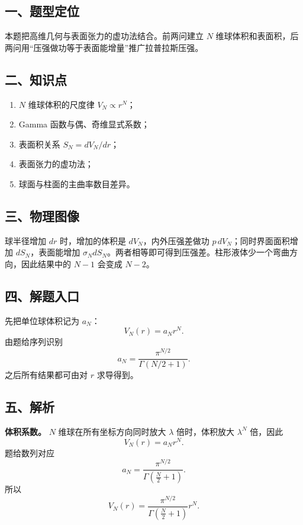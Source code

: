 \documentclass[12pt,a4paper,UTF8]{ctexart}
\newcommand{\tightlist}{\setlength{\itemsep}{0pt}\setlength{\parskip}{0pt}}
\begin{document}
\subsection{一、题型定位}\label{ux4e00ux9898ux578bux5b9aux4f4d-2}

本题把高维几何与表面张力的虚功法结合。前两问建立 \(N\)
维球体积和表面积，后两问用``压强做功等于表面能增量''推广拉普拉斯压强。

\subsection{二、知识点}\label{ux4e8cux77e5ux8bc6ux70b9-2}

\begin{enumerate}
\def\labelenumi{\arabic{enumi}.}
\tightlist
\item
  \(N\) 维球体积的尺度律 \(V_N\propto r^N\)；
\item
  Gamma 函数与偶、奇维显式系数；
\item
  表面积关系 \(S_N=dV_N/dr\)；
\item
  表面张力的虚功法；
\item
  球面与柱面的主曲率数目差异。
\end{enumerate}

\subsection{三、物理图像}\label{ux4e09ux7269ux7406ux56feux50cf-2}

球半径增加 \(dr\) 时，增加的体积是 \(dV_N\)，内外压强差做功
\(p\,dV_N\)；同时界面面积增加 \(dS_N\)，表面能增加
\(\sigma_NdS_N\)。两者相等即可得到压强差。柱形液体少一个弯曲方向，因此结果中的
\(N-1\) 会变成 \(N-2\)。

\subsection{四、解题入口}\label{ux56dbux89e3ux9898ux5165ux53e3-2}

先把单位球体积记为 \(a_N\)： \[
V_N(r)=a_Nr^N.
\] 由题给序列识别 \[
a_N=\frac{\pi^{N/2}}{\Gamma(N/2+1)}.
\] 之后所有结果都可由对 \(r\) 求导得到。

\subsection{五、解析}\label{ux4e94ux89e3ux6790-2}

\textbf{体积系数。} \(N\) 维球在所有坐标方向同时放大 \(\lambda\)
倍时，体积放大 \(\lambda^N\) 倍，因此 \[
V_N(r)=a_Nr^N. \tag{1}
\] 题给数列对应 \[
\boxed{
a_N=\frac{\pi^{N/2}}{\Gamma\!\left(\frac N2+1\right)}
}. \tag{2}
\] 所以 \[
\boxed{
V_N(r)
=\frac{\pi^{N/2}}{\Gamma\!\left(\frac N2+1\right)}r^N
}. \tag{3}
\]
\end{document}

